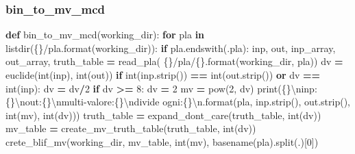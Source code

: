 \documentclass[
  italian,
]{book}
\newenvironment{Shaded}{\begin{snugshade}}{\end{snugshade}}
\newcommand{\BuiltInTok}[1]{#1}
\newcommand{\CharTok}[1]{\textcolor[rgb]{0.31,0.60,0.02}{#1}}
\newcommand{\ControlFlowTok}[1]{\textcolor[rgb]{0.13,0.29,0.53}{\textbf{#1}}}
\newcommand{\DecValTok}[1]{\textcolor[rgb]{0.00,0.00,0.81}{#1}}
\newcommand{\KeywordTok}[1]{\textcolor[rgb]{0.13,0.29,0.53}{\textbf{#1}}}
\newcommand{\NormalTok}[1]{#1}
\newcommand{\OperatorTok}[1]{\textcolor[rgb]{0.81,0.36,0.00}{\textbf{#1}}}
\newcommand{\SpecialCharTok}[1]{\textcolor[rgb]{0.00,0.00,0.00}{#1}}
\newcommand{\StringTok}[1]{\textcolor[rgb]{0.31,0.60,0.02}{#1}}
\begin{document}
\newpage

\hypertarget{bin_to_mv_mcd}{%
\subsubsection{bin\_to\_mv\_mcd}\label{bin_to_mv_mcd}}

\begin{Shaded}
\begin{Highlighting}[]
\KeywordTok{def}\NormalTok{ bin\_to\_mv\_mcd(working\_dir):}
  \ControlFlowTok{for}\NormalTok{ pla }\KeywordTok{in}\NormalTok{ listdir(}\StringTok{\textquotesingle{}}\SpecialCharTok{\{\}}\StringTok{/pla\textquotesingle{}}\NormalTok{.}\BuiltInTok{format}\NormalTok{(working\_dir)):}
    \ControlFlowTok{if}\NormalTok{ pla.endswith(}\StringTok{\textquotesingle{}.pla\textquotesingle{}}\NormalTok{):}
\NormalTok{      inp, out, inp\_array, out\_array, truth\_table }\OperatorTok{=}\NormalTok{ read\_pla(}
        \StringTok{\textquotesingle{}}\SpecialCharTok{\{\}}\StringTok{/pla/}\SpecialCharTok{\{\}}\StringTok{\textquotesingle{}}\NormalTok{.}\BuiltInTok{format}\NormalTok{(working\_dir, pla))}
\NormalTok{      dv }\OperatorTok{=}\NormalTok{ euclide(}\BuiltInTok{int}\NormalTok{(inp), }\BuiltInTok{int}\NormalTok{(out))}
      \ControlFlowTok{if} \BuiltInTok{int}\NormalTok{(inp.strip()) }\OperatorTok{==} \BuiltInTok{int}\NormalTok{(out.strip()) }\KeywordTok{or}\NormalTok{ dv }\OperatorTok{==} \BuiltInTok{int}\NormalTok{(inp):}
\NormalTok{        dv }\OperatorTok{=}\NormalTok{ dv}\OperatorTok{/}\DecValTok{2}
      \ControlFlowTok{if}\NormalTok{ dv }\OperatorTok{\textgreater{}=} \DecValTok{8}\NormalTok{:}
\NormalTok{        dv }\OperatorTok{=} \DecValTok{2} 
\NormalTok{        mv }\OperatorTok{=} \BuiltInTok{pow}\NormalTok{(}\DecValTok{2}\NormalTok{, dv)}
        \BuiltInTok{print}\NormalTok{(}\StringTok{\textquotesingle{}}\SpecialCharTok{\{\}}\CharTok{\textbackslash{}n}\StringTok{inp: }\SpecialCharTok{\{\}}\CharTok{\textbackslash{}n}\StringTok{out:}\SpecialCharTok{\{\}}\CharTok{\textbackslash{}n}\StringTok{multi{-}valore:}\SpecialCharTok{\{\}}\CharTok{\textbackslash{}n}\StringTok{divide ogni:}\SpecialCharTok{\{\}}\CharTok{\textbackslash{}n}\StringTok{\textquotesingle{}}\NormalTok{.}\BuiltInTok{format}\NormalTok{(pla,}
\NormalTok{          inp.strip(), out.strip(), }\BuiltInTok{int}\NormalTok{(mv), }\BuiltInTok{int}\NormalTok{(dv)))}
\NormalTok{        truth\_table }\OperatorTok{=}\NormalTok{ expand\_dont\_care(truth\_table, }\BuiltInTok{int}\NormalTok{(dv))}
\NormalTok{        mv\_table }\OperatorTok{=}\NormalTok{ create\_mv\_truth\_table(truth\_table, }\BuiltInTok{int}\NormalTok{(dv))}
\NormalTok{        crete\_blif\_mv(working\_dir, mv\_table, }\BuiltInTok{int}\NormalTok{(mv),}
\NormalTok{          basename(pla).split(}\StringTok{\textquotesingle{}.\textquotesingle{}}\NormalTok{)[}\DecValTok{0}\NormalTok{])}
\end{Highlighting}
\end{Shaded}
\end{document}
